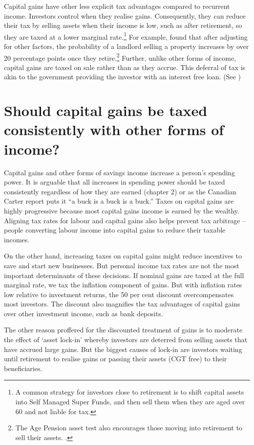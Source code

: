 \documentclass{grattan}\usepackage[]{graphicx}\usepackage[]{color}
\begin{document}
Capital gains have other less explicit tax advantages compared to recurrent income. Investors control when they realise gains. Consequently, they can reduce their tax by selling assets when their income is low, such as after retirement, so they are taxed at a lower marginal rate.\footnote{A common strategy for investors close to retirement is to shift capital assets into Self Managed Super Funds, and then sell them when they are aged over 60 and not liable for tax.}  For example, \textcite{Wood2010a} found that after adjusting for other factors, the probability of a landlord selling a property increases by over 20 percentage points once they retire.\footnote{The Age Pension asset test also encourages those moving into retirement to sell their assets. \textcite{Wood2010a}.}
Further, unlike other forms of income, capital gains are taxed on sale rather than as they accrue. This deferral of tax is akin to the government providing the investor with an interest free loan. (See )

\section{Should capital gains be taxed consistently with other forms of income?}\label{sec:ShouldCapitalGainsBeTaxedConsistently}
Capital gains and other forms of savings income increase a person's spending power. It is arguable that all increases in spending power should be taxed consistently regardless of how they are earned (chapter 2)  or as the Canadian Carter report puts it ``a buck is a buck is a buck.''  Taxes on capital gains are highly progressive because most capital gains income is earned by the wealthy. Aligning tax rates for labour and capital gains also helps prevent tax arbitrage -- people converting labour income into capital gains to reduce their taxable incomes. 

On the other hand, increasing taxes on capital gains might reduce incentives to save and start new businesses. But personal income tax rates are not the most important determinants of these decisions. If nominal gains are taxed at the full marginal rate, we tax the inflation component of gains.  But with inflation rates low relative to investment returns, the 50 per cent discount overcompensates most investors. The discount also magnifies the tax advantages of capital gains over other investment income, such as bank deposits.

The other reason proffered for the discounted treatment of gains is to moderate the effect of `asset lock-in' whereby investors are deterred from selling assets that have accrued large gains. But the biggest causes of lock-in are investors waiting until retirement to realise gains or passing their assets (CGT free) to their beneficiaries. 
\end{document}
